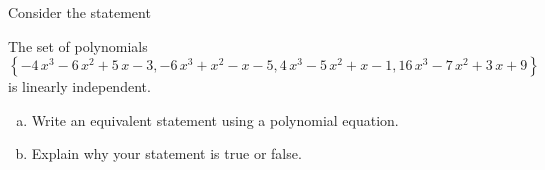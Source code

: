 
\begin{exerciseStatement}


Consider the statement 
\begin{center}\begin{minipage}{0.8\textwidth}
 The set of polynomials \( \left\{ -4 \, x^{3} - 6 \, x^{2} + 5 \, x - 3 , -6 \, x^{3} + x^{2} - x - 5 , 4 \, x^{3} - 5 \, x^{2} + x - 1 , 16 \, x^{3} - 7 \, x^{2} + 3 \, x + 9 \right\} \) is linearly independent.
\end{minipage}\end{center}
    


\begin{enumerate}[(a)]
\item  Write an equivalent statement using a polynomial equation.
\item  Explain why your statement is true or false.
\end{enumerate}
    
\end{exerciseStatement}
    

